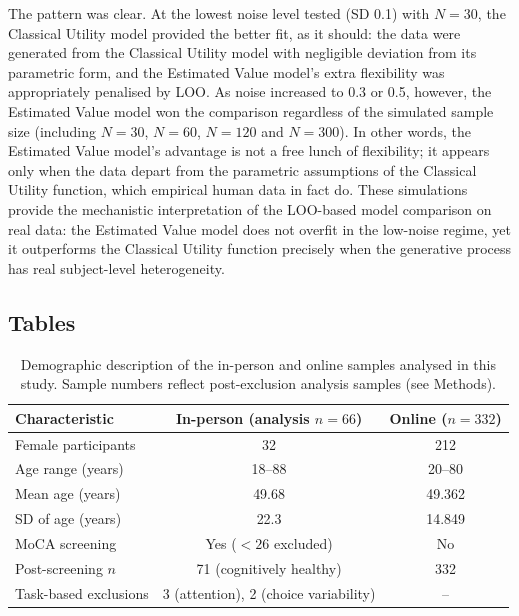 \documentclass[11pt]{article}
\begin{document}
The pattern was clear. At the lowest noise level tested (SD 0.1) with $N = 30$, the Classical Utility model provided the better fit, as it should: the data were generated from the Classical Utility model with negligible deviation from its parametric form, and the Estimated Value model's extra flexibility was appropriately penalised by LOO. As noise increased to 0.3 or 0.5, however, the Estimated Value model won the comparison regardless of the simulated sample size (including $N=30$, $N=60$, $N=120$ and $N=300$). In other words, the Estimated Value model's advantage is not a free lunch of flexibility; it appears only when the data depart from the parametric assumptions of the Classical Utility function, which empirical human data in fact do. These simulations provide the mechanistic interpretation of the LOO-based model comparison on real data: the Estimated Value model does not overfit in the low-noise regime, yet it outperforms the Classical Utility function precisely when the generative process has real subject-level heterogeneity.

\subsection{Tables}

\begin{table}[htbp]
\centering
\caption{Demographic description of the in-person and online samples analysed in this study. Sample numbers reflect post-exclusion analysis samples (see Methods).}
\label{tab:demographics}
\begin{tabular}{lcc}
\toprule
Characteristic & In-person (analysis $n=66$) & Online ($n=332$) \\
\midrule
Female participants & 32 & 212 \\
Age range (years) & 18--88 & 20--80 \\
Mean age (years) & 49.68 & 49.362 \\
SD of age (years) & 22.3 & 14.849 \\
MoCA screening & Yes ($<26$ excluded) & No \\
Post-screening $n$ & 71 (cognitively healthy) & 332 \\
Task-based exclusions & 3 (attention), 2 (choice variability) & -- \\
\bottomrule
\end{tabular}
\end{table}
\end{document}
